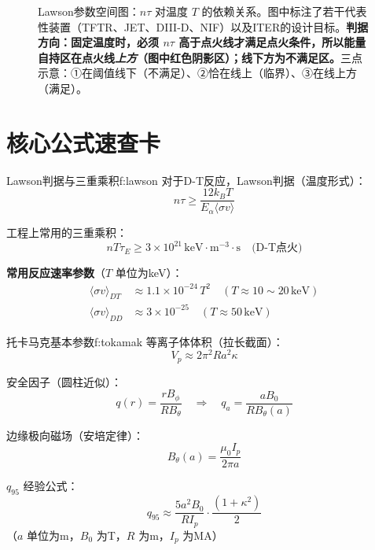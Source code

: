 \begin{figure}[htbp]
    \caption{Lawson参数空间图：$n\tau$ 对温度 $T$ 的依赖关系。图中标注了若干代表性装置（TFTR、JET、DIII-D、NIF）以及ITER的设计目标。\textbf{判据方向：固定温度时，必须 $n\tau$ 高于点火线才满足点火条件，所以能量自持区在点火线\emph{上方}（图中红色阴影区）；线下方为不满足区。}三点示意：①在阈值线下（不满足）、②恰在线上（临界）、③在线上方（满足）。}
    \label{fig:lawson}
\end{figure}


\section{核心公式速查卡}

\begin{formulabox}{Lawson判据与三重乘积}{f:lawson}
对于D-T反应，Lawson判据（温度形式）：
\begin{equation}
    n\tau \geq \frac{12k_B T}{E_{\alpha}\langle\sigma v\rangle}
\label{eq:ch10-lawson-simplified-ex}
\end{equation}

工程上常用的三重乘积：
\[
    nT\tau_E \geq 3\times10^{21}\,\mathrm{keV\cdot m^{-3}\cdot s}\quad\text{(D-T点火)}
\]

\textbf{常用反应速率参数}（$T$ 单位为keV）：
\begin{align*}
    \langle\sigma v\rangle_{DT} &\approx 1.1\times10^{-24}\,T^2\quad (T\approx10\sim20\,\mathrm{keV})\\
    \langle\sigma v\rangle_{DD} &\approx 3\times10^{-25}\quad (T\approx50\,\mathrm{keV})
\end{align*}
\end{formulabox}

\begin{formulabox}{托卡马克基本参数}{f:tokamak}
等离子体体积（拉长截面）：
\[
    V_p \approx 2\pi^2 R a^2 \kappa
\]

安全因子（圆柱近似）：
\[
    q(r) = \frac{r B_{\phi}}{R B_{\theta}} \quad\Rightarrow\quad q_a = \frac{a B_0}{R B_{\theta}(a)}
\]

边缘极向磁场（安培定律）：
\begin{equation}
    B_{\theta}(a) = \frac{\mu_0 I_p}{2\pi a}
\label{eq:ch10-poloidal-field-ex}
\end{equation}

$q_{95}$ 经验公式：
\[
    q_{95} \approx \frac{5 a^2 B_0}{R I_p}\cdot\frac{(1+\kappa^2)}{2}
\]
（$a$ 单位为m，$B_0$ 为T，$R$ 为m，$I_p$ 为MA）
\end{formulabox}

